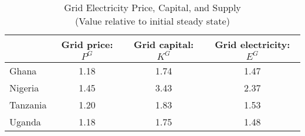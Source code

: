 \begin{table}[H] 
\singlespace 
\center 
\caption{Grid Electricity Price, Capital, and Supply \\ (Value relative to initial steady state)} \label{Kg_pg}
\vspace{-.1in} 
\begin{tabular}{l c c c}\hline 
\hline 
  & Grid price: $P^G$ & Grid capital: $K^G$ & Grid electricity: $E^G$   \\ 
\hline 
Ghana &      1.18 &     1.74 &     1.47    \\  Nigeria  &      1.45 &     3.43 &     2.37    \\  Tanzania &      1.20 &     1.83 &     1.53   \\ Uganda &       1.18 &     1.75 &     1.48 \\  \hline 
\end{tabular}
\end{table} 
